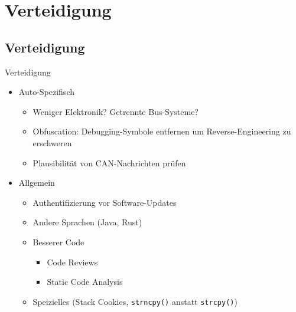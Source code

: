 \section{Verteidigung}

\subsection{Verteidigung}

\begin{frame}[fragile]{Verteidigung}
    \begin{itemize}[<+->]
        \item Auto-Spezifisch
        \begin{itemize}
            \item Weniger Elektronik? Getrennte Bus-Systeme?
            \item Obfuscation: Debugging-Symbole entfernen um Reverse-Engineering
                  zu erschweren
            \item Plausibilität von CAN-Nachrichten prüfen
        \end{itemize}
        \item Allgemein
        \begin{itemize}
            \item Authentifizierung vor Software-Updates
            \item Andere Sprachen (Java, Rust)
            \item Besserer Code
            \begin{itemize}
                \item Code Reviews
                \item Static Code Analysis
            \end{itemize}
            \item Speizielles (Stack Cookies, \verb+strncpy()+ anstatt \verb+strcpy()+)
        \end{itemize}
    \end{itemize}
\end{frame}